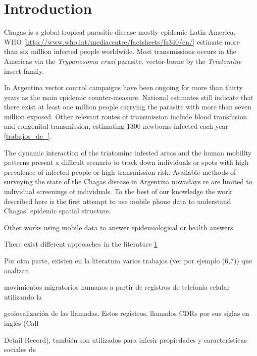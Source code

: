 \section{Introduction}

Chagas is a global tropical parasitic disease mostly epidemic Latin America. WHO \ref{http://www.who.int/mediacentre/factsheets/fs340/en/} estimate more than six million infected people worldwide. Most transmissions occurs in the Americas via the \textit{Trypanosoma cruzi} parasite, vector-borne by the \textit{Triatomine} insect family.

In Argentina vector control campaigns have been ongoing for more than thirty years as the main epidemic counter-measure. National estimates still indicate that there exist at least one million people carrying the parasite with more than seven million exposed.
Other relevant routes of transmission include blood transfusion and congenital transmission, estimating 1300 newborns infected each year \ref{trabajos_de_}.\begin{comment}  en el drive estan las ppt del min salud \end{comment}

The dynamic interaction of the triatomine infested areas and the human mobility patterns present a difficult scenario to track down individuals or spots with high prevalence of infected people or high transmission risk. Available methods of surveying the state of the Chagas disease in Argentina nowadays re are limited to individual screenings of individuals. To the best of our knowledge the work described here is the first attempt to use mobile phone data to understand Chagas' epidemic spatial structure. \begin{comment}  Existe una forma de decir esto de manera correcta.. o asi les parece bien? \end{comment}

Other works using mobile data to answer epidemiological or health answers 

There exist different approaches in the literature \ref{}

Por otra parte, existen en la literatura varios trabajos (ver por ejemplo (6,7)) que analizan

movimientos migratorios humanos a partir de registros de telefonía celular utilizando la

geolocalización de las llamadas. Estos registros, llamados CDRs por sus siglas en inglés (Call

Detail Record), también son utilizados para inferir propiedades y características sociales de

